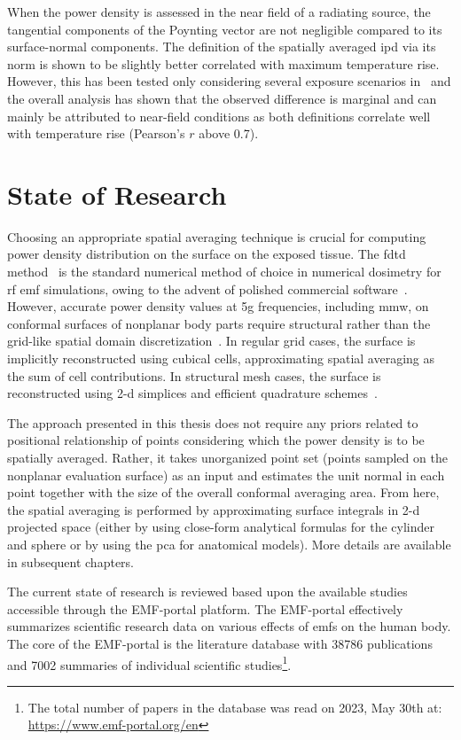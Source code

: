 When the power density is assessed in the near field of a radiating source, the tangential components of the Poynting vector are not negligible compared to its surface-normal components.
The definition of the spatially averaged \gls{ipd} via its norm is shown to be slightly better correlated with maximum temperature rise.
However, this has been tested only considering several exposure scenarios in~\cite{IEEE2021Guide} and the overall analysis has shown that the observed difference is marginal and can mainly be attributed to near-field conditions as both definitions correlate well with temperature rise (Pearson's $r$ above 0.7).

\section{State of Research}
Choosing an appropriate spatial averaging technique is crucial for computing power density distribution on the surface on the exposed tissue.
The \gls{fdtd} method~\cite{Sullivan1987Use} is the standard numerical method of choice in numerical dosimetry for \gls{rf} \gls{emf} simulations, owing to the advent of polished commercial software~\cite{Hirata2021Human}.
However, accurate power density values at \gls{5g} frequencies, including \gls{mmw}, on conformal surfaces of nonplanar body parts require structural rather than the grid-like spatial domain discretization~\cite{Poljak2018conformal}.
In regular grid cases, the surface is implicitly reconstructed using cubical cells, approximating spatial averaging as the sum of cell contributions.
In structural mesh cases, the surface is reconstructed using \gls{2-d} simplices and efficient quadrature schemes~\cite{Dunavant1985High,Dunavant1985Economical}.

The approach presented in this thesis does not require any priors related to positional relationship of points considering which the power density is to be spatially averaged.
Rather, it takes unorganized point set (points sampled on the nonplanar evaluation surface) as an input and estimates the unit normal in each point together with the size of the overall conformal averaging area.
From here, the spatial averaging is performed by approximating surface integrals in \gls{2-d} projected space (either by using close-form analytical formulas for the cylinder and sphere or by using the \gls{pca} for anatomical models).
More details are available in subsequent chapters.

The current state of research is reviewed based upon the available studies accessible through the EMF-portal platform.
The EMF-portal effectively summarizes scientific research data on various effects of \gls{emf}s on the human body.
The core of the EMF-portal is the literature database with \num{38786} publications and \num{7002} summaries of individual scientific studies\footnote{The total number of papers in the database was read on 2023, May 30th at: \url{https://www.emf-portal.org/en}}.

